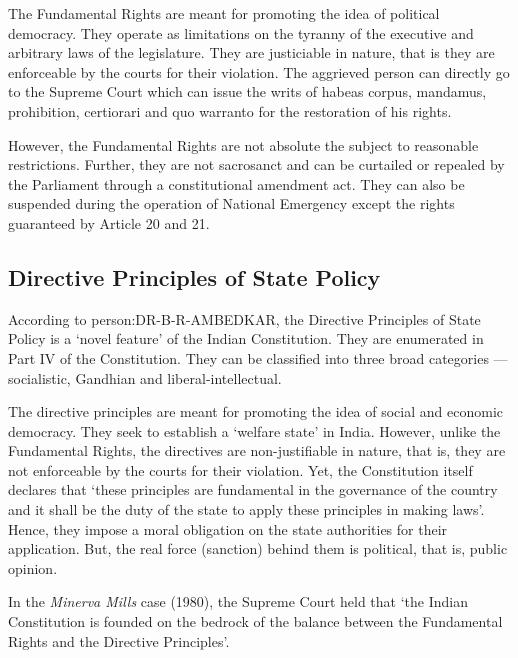 The Fundamental Rights are meant for promoting the idea of political democracy. They operate as limitations on the tyranny of the executive and arbitrary laws of the legislature. They are justiciable in nature, that is they are enforceable by the courts for their violation. The aggrieved person can directly go to the Supreme Court which can issue the writs of { habeas corpus}, { mandamus}, prohibition, { certiorari} and { quo warranto} for the restoration of his rights.

However, the Fundamental Rights are not absolute the subject to reasonable restrictions. Further, they are not sacrosanct and can be curtailed or repealed by the Parliament through a constitutional amendment act. They can also be suspended during the operation of National Emergency except the rights guaranteed by Article 20 and 21.

\subsection{Directive Principles of State Policy}

According to \gls{person:DR-B-R-AMBEDKAR}, the Directive Principles of State Policy is a `novel feature' of the Indian Constitution. They are enumerated in Part IV of the Constitution. They can be classified into three broad categories — socialistic, Gandhian and liberal-intellectual.

The directive principles are meant for promoting the idea of social and economic democracy. They seek to establish a `welfare state' in India. However, unlike the Fundamental Rights, the directives are non-justifiable in nature, that is, they are not enforceable by the courts for their violation. Yet, the Constitution itself declares that `these principles are fundamental in the governance of the country and it shall be the duty of the state to apply these principles in making laws'. Hence, they impose a moral obligation on the state authorities for their application. But, the real force (sanction) behind them is political, that is, public opinion.

In the { \textit{Minerva Mills}} case (1980), the Supreme Court held that `the Indian Constitution is founded on the bedrock of the balance between the Fundamental Rights and the Directive Principles'.

